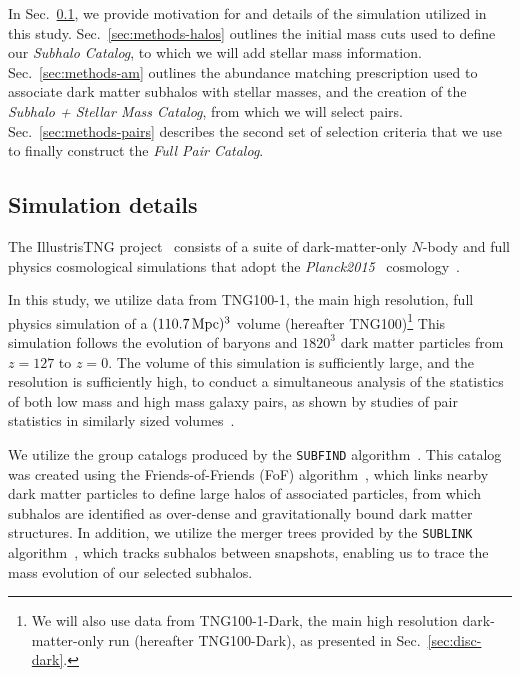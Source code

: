 \documentclass[twocolumn]{aastex631}
\newcommand{\subcat}{\textit{Subhalo Catalog}}
\newcommand{\starcat}{\textit{Subhalo + Stellar Mass Catalog}}
\newcommand{\paircat}{\textit{Full Pair Catalog}}
\begin{document}
In Sec.~\ref{sec:methods-sims}, we provide motivation for and details of the simulation utilized in this study.
Sec.~\ref{sec:methods-halos} outlines the initial mass cuts used to define our \subcat, to which we will add stellar mass information. 
Sec.~\ref{sec:methods-am} outlines the abundance matching prescription used to associate dark matter subhalos with stellar masses, and the creation of the \starcat, from which we will select pairs.
Sec.~\ref{sec:methods-pairs} describes the second set of selection criteria that we use to finally construct the \paircat. 

    \subsection{Simulation details} \label{sec:methods-sims}
    The IllustrisTNG project~\citep{TNG1, TNG2, TNG3, TNG4, TNG5} consists of a suite of dark-matter-only $N$-body and full physics cosmological simulations that adopt the \textit{Planck2015} \lcdm\  cosmology~\citep{Planck2015}.
    
    In this study, we utilize data from TNG100-1, the main high resolution, full physics simulation of a $(110.7\,\mathrm{Mpc})^3$ volume (hereafter TNG100)\footnote{We will also use data from TNG100-1-Dark, the main high resolution dark-matter-only run (hereafter TNG100-Dark), as presented in Sec.~\ref{sec:disc-dark}.} 
    This simulation follows the evolution of baryons and $1820^3$ dark matter particles from $z=127$ to $z=0$.  
    The volume of this simulation is sufficiently large, and the resolution is sufficiently high, to conduct a simultaneous analysis of the statistics of both low mass and high mass galaxy pairs, as shown by studies of pair statistics in similarly sized volumes~\citep{Sales2013,Patel2017a-Orbits,Patel2017b-Masses,Besla2018}. 

    We utilize the group catalogs produced by the \texttt{SUBFIND} algorithm~\citep{Springel2001,Dolag2009}. 
    This catalog was created using the Friends-of-Friends (FoF) algorithm~\citep{Davis1985}, which links nearby dark matter particles to define large halos of associated particles, from which subhalos are identified as over-dense and gravitationally bound dark matter structures.
    In addition, we utilize the merger trees provided by the \texttt{SUBLINK} algorithm~\citep{RG2015}, which tracks subhalos between snapshots, enabling us to trace the mass evolution of our selected subhalos. 
\end{document}
